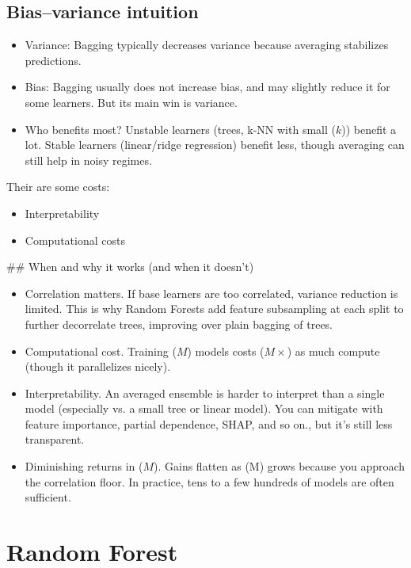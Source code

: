 \subsection{Bias–variance intuition}

\begin{itemize}
	\item Variance: Bagging typically decreases variance because averaging stabilizes predictions.
	\item Bias: Bagging usually does not increase bias, and may slightly reduce it for some learners. But its main win is variance.
	\item Who benefits most? Unstable learners (\eg trees, k-NN with small ($k$)) benefit a lot. Stable learners (\eg linear/ridge regression) benefit less, though averaging can still help in noisy regimes.
\end{itemize}

Their are some costs: 
\begin{itemize}
	\item Interpretability
	\item Computational costs
\end{itemize}

## When and why it works (and when it doesn't)

\begin{itemize}
	\item Correlation matters. If base learners are too correlated, variance reduction is limited. This is why Random Forests add feature subsampling at each split to further decorrelate trees, improving over plain bagging of trees.
	\item Computational cost. Training ($M$) models costs ($M\times$) as much compute (though it parallelizes nicely).
	\item Interpretability. An averaged ensemble is harder to interpret than a single model (especially vs. a small tree or linear model). You can mitigate with feature importance, partial dependence, SHAP, and so on., but it's still less transparent.
	\item Diminishing returns in ($M$). Gains flatten as (M) grows because you approach the correlation floor. In practice, tens to a few hundreds of models are often sufficient.
\end{itemize}

\section{Random Forest}

